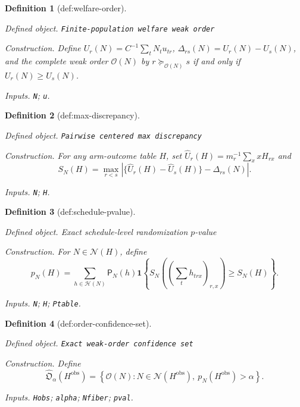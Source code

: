 \documentclass{article}
\newtheorem{definition}{Definition}
\begin{document}
\begin{definition}[def:welfare-order]\label{def:welfare-order}
\par\smallskip\noindent\emph{Defined object.} \texttt{Finite-\allowbreak{}population welfare weak order}
\par\smallskip\noindent\emph{Construction.} Define \(U_r(N)=C^{-1}\sum_tN_tu_{tr}\), \(\Delta_{rs}(N)=U_r(N)-U_s(N)\), and the complete weak order \(\mathcal O(N)\) by \(r\succeq_{\mathcal O(N)}s\) if and only if \(U_r(N)\ge U_s(N)\).
\par\smallskip\noindent\emph{Inputs.} \texttt{N}; \texttt{u}.
\end{definition}

\begin{definition}[def:max-discrepancy]\label{def:max-discrepancy}
\par\smallskip\noindent\emph{Defined object.} \texttt{Pairwise centered max discrepancy}
\par\smallskip\noindent\emph{Construction.} For any arm-outcome table \(H\), set \(\widehat U_r(H)=m_r^{-1}\sum_xxH_{rx}\) and \[S_N(H)=\max_{r<s}\left|\{\widehat U_r(H)-\widehat U_s(H)\}-\Delta_{rs}(N)\right|.\]
\par\smallskip\noindent\emph{Inputs.} \texttt{N}; \texttt{H}.
\end{definition}

\begin{definition}[def:schedule-pvalue]\label{def:schedule-pvalue}
\par\smallskip\noindent\emph{Defined object.} Exact schedule-level randomization \(p\)-value
\par\smallskip\noindent\emph{Construction.} For \(N\in\mathcal N(H)\), define \[p_N(H)=\sum_{h\in\mathcal H(N)}\mathsf P_N(h)\mathbf 1\!\left\{S_N\!\left((\sum_t h_{trx})_{r,x}\right)\ge S_N(H)\right\}.\]
\par\smallskip\noindent\emph{Inputs.} \texttt{N}; \texttt{H}; \texttt{Ptable}.
\end{definition}

\begin{definition}[def:order-confidence-set]\label{def:order-confidence-set}
\par\smallskip\noindent\emph{Defined object.} \texttt{Exact weak-\allowbreak{}order confidence set}
\par\smallskip\noindent\emph{Construction.} Define \[\widehat{\mathfrak O}_{\alpha}(H^{\mathrm{obs}})=\left\{\mathcal O(N):N\in\mathcal N(H^{\mathrm{obs}}),\ p_N(H^{\mathrm{obs}})>\alpha\right\}.\]
\par\smallskip\noindent\emph{Inputs.} \texttt{Hobs}; \texttt{alpha}; \texttt{Nfiber}; \texttt{pval}.
\end{definition}
\end{document}
